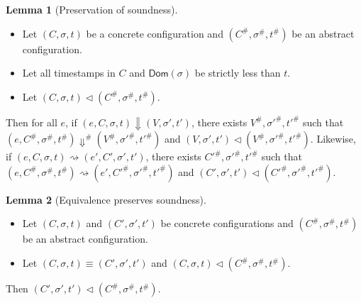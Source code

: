 \documentclass{article}
\theoremstyle{definition}
\newtheorem{lem}{Lemma}[section]
\newcommand*{\A}[1]{{#1}^{\#}}
\begin{document}
\begin{lem}[Preservation of soundness]
  $\:$

  \begin{itemize}
    \item Let $(C,\sigma,t)$ be a concrete configuration and $(C^{\#},\sigma^{\#},t^{\#})$ be an abstract configuration.
    \item Let all timestamps in $C$ and $\mathsf{Dom}(\sigma)$ be strictly less than $t$.
    \item Let $(C,\sigma,t)\lhd(\A{C},\A{\sigma},\A{t})$.
  \end{itemize}

  Then for all $e$, if $(e,C,\sigma,t)\Downarrow(V,\sigma',t')$, there exists $\A{V},\A{\sigma'},\A{t'}$ such that $(e,\A{C},\A{\sigma},\A{t})\A{\Downarrow}(\A{V},\A{\sigma'},\A{t'})$ and $(V,\sigma',t')\lhd(\A{V},\A{\sigma'},\A{t'})$.
  Likewise, if $(e,C,\sigma,t)\rightsquigarrow(e',C',\sigma',t')$, there exists $\A{C'},\A{\sigma'},\A{t'}$ such that $(e,\A{C},\A{\sigma},\A{t})\rightsquigarrow(e',\A{C'},\A{\sigma'},\A{t'})$ and $(C',\sigma',t')\lhd(\A{C'},\A{\sigma'},\A{t'})$.
\end{lem}

\begin{lem}[Equivalence preserves soundness]
  $\:$

  \begin{itemize}
    \item Let $(C,\sigma,t)$ and $(C',\sigma',t')$ be concrete configurations and $(C^{\#},\sigma^{\#},t^{\#})$ be an abstract configuration.
    \item Let $(C,\sigma,t)\equiv(C',\sigma',t')$ and $(C,\sigma,t)\lhd(\A{C},\A{\sigma},\A{t})$.
  \end{itemize}

  Then $(C',\sigma',t')\lhd(\A{C},\A{\sigma},\A{t})$.
\end{lem}
\end{document}

